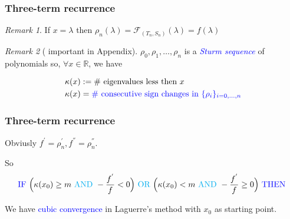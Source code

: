 \documentclass{beamer}
\newcommand{\R}{\mathbb{R}}
\newcommand{\effe}[2]{\mathcal{F}_{#1}(#2)}
\theoremstyle{definition} \newtheorem{de}{Def}
\theoremstyle{remark} \newtheorem{os}[de]{Remark}
\theoremstyle{plain} \newtheorem{te}[de]{Teo}
\theoremstyle{plain} \newtheorem{co}[de]{Cor}
\theoremstyle{plain} \newtheorem{pr}[de]{Prop}
\theoremstyle{plain} \newtheorem{lem}[de]{Lemm}
\theoremstyle{remark} \newtheorem{rem}[de]{Remark}
\begin{document}
\begin{frame}[label=BeforeSturmSequence]
  \frametitle{Three-term recurrence}

  \begin{os}
    If $x = \lambda$ then $\rho_n(\lambda)=\effe{(T_n,S_n)}{\lambda}=f(\lambda)$
  \end{os}

  \begin{os}[ important \hyperlink{SturmSequence}{} in Appendix]
    $\rho_0,\rho_1,\dots,\rho_n$ is a \textcolor{blue}{\emph{Sturm sequence}} of polynomials so, $\forall x\in\R$, we have

    \begin{align*}
      \kappa(x) &:= \text{\# eigenvalues less then } x \\
      \kappa(x) &= \textcolor{blue}{ \text{\# consecutive sign changes in } \{ \rho_i \}_{i=0,\dots,n} }
    \end{align*}
  \end{os}

  
\end{frame}

\begin{frame}
  \frametitle{Three-term recurrence}

  Obviusly $f^{'}=\rho_n^{'},f^{''}=\rho_n^{''}$.



  \pause

  So 
  \begin{equation*}
    \textcolor{blue}{\text{IF }} \Big( \kappa(x_0)\ge m \textcolor{cyan}{\text{ AND }} -\frac{f^{'}}{f}< 0 \Big) \textcolor{cyan}{\text{ OR }} \Big( \kappa(x_0) < m \textcolor{cyan}{\text{ AND }} -\frac{f^{'}}{f}\ge 0 \Big) \textcolor{blue}{\text{ THEN }}
  \end{equation*}

  \pause

  We have \textcolor{blue}{cubic convergence} in Laguerre's method with $x_0$ as starting point.

\end{frame}
\end{document}
